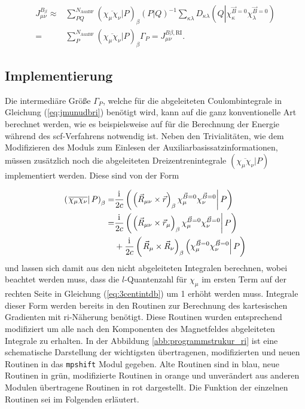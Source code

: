 	\begin{equation}\label{eq:jmunudbri}
	\begin{aligned}
	J_{\mu\nu}^{B_\beta}\approx &\sum_{PQ}^{N_{\textrm{AuxBF}}}\left(\overline{\chi_\mu\chi_\nu}\vert P\right)_\beta\left(P\vert Q\right)^{-1}\sum_{\kappa\lambda}D_{\kappa\lambda}\left(Q\left\vert\chi_\kappa^{\vec{B}=0}\chi_\lambda^{\vec{B}=0}\right.\right)\\
	=&\sum_{P}^{N_{\textrm{AuxBF}}}\left(\overline{\chi_\mu\chi_\nu}\vert P\right)_\beta\Gamma_P=J_{\mu\nu}^{B\beta ,\textrm{RI}}.
	\end{aligned}
	\end{equation}
	\vfill
	\subsection{Implementierung}
	Die intermediäre Größe $\Gamma_P$, welche für die abgeleiteten Coulombintegrale in Gleichung (\ref{eq:jmunudbri}) benötigt wird, kann auf die ganz konventionelle Art berechnet werden, wie es beispielsweise auf für die Berechnung der Energie während des \ac{scf}-Verfahrens notwendig ist. Neben den Trivialitäten, wie dem Modifizieren des Moduls zum Einlesen der Auxiliarbasissatzinformationen, müssen zusätzlich noch die abgeleiteten Dreizentrenintegrale $\left(\overline{\chi_\mu\chi_\nu}\vert P\right)$ implementiert werden. Diese sind von der Form
	
	\begin{equation}\label{eq:3centintdb}
	\begin{aligned}
	\left(\left.\overline{\chi_\mu\chi_\nu}\right\vert P\right)_\beta=&\frac{\mathrm{i}\mkern1mu}{2c}\left(\left.\left(\vec{R}_{\mu\nu}\times\vec{r}\right)_\beta\chi_\mu^{\vec{B}=0}\chi_\nu^{\vec{B}=0}\right\vert P\right)\\
	=&\frac{\mathrm{i}\mkern1mu}{2c}\left(\left.\left(\vec{R}_{\mu\nu}\times\vec{r}_\mu\right)_\beta\chi_\mu^{\vec{B}=0}\chi_\nu^{\vec{B}=0}\right\vert P\right)\\
	&+\frac{\mathrm{i}\mkern1mu}{2c}\left(\left.\vec{R}_\mu\times\vec{R}_\nu\right)_\beta\left(\chi_\mu^{\vec{B}=0}\chi_\nu^{\vec{B}=0}\right\vert P\right)
	\end{aligned}
	\end{equation}
	und lassen sich damit aus den nicht abgeleiteten Integralen berechnen, wobei beachtet werden muss, dass die $l$-Quantenzahl für $\chi_\mu$ im ersten Term auf der rechten Seite in Gleichung (\ref{eq:3centintdb}) um 1 erhöht werden muss. Integrale dieser Form werden bereits in den Routinen zur Berechnung des kartesischen Gradienten mit \ac{ri}-Näherung benötigt. Diese Routinen wurden entsprechend modifiziert um alle nach den Komponenten des Magnetfeldes abgeleiteten Integrale zu erhalten. In der Abbildung \ref{abb:programmstrukur_ri} ist eine schematische Darstellung der wichtigsten übertragenen, modifizierten und neuen Routinen in das \texttt{mpshift} Modul gegeben. Alte Routinen sind in blau, neue Routinen in grün, modifizierte Routinen in orange und unverändert aus anderen Modulen übertragene Routinen in rot dargestellt. Die Funktion der einzelnen Routinen sei im Folgenden erläutert.
	
